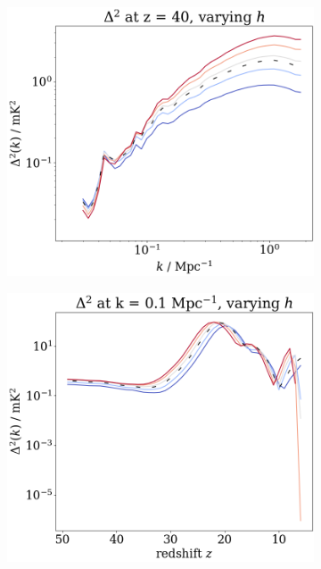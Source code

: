 \documentclass[floats,floatfix,showpacs,amssymb,prd,superscriptaddress,nofootinbib]{revtex4-2} %
\begin{document}
\begin{figure}[H]
\begin{subfigure}[b]{0.45\textwidth}
         \includegraphics[width=\textwidth]{images/simulation_results/power_spectrum_fixed_z_40_h.png}
         \label{fig:power_spectrum_fixed_z_40_h}
     \end{subfigure}
     \hfill
     \begin{subfigure}[b]{0.45\textwidth}
         \centering
         \includegraphics[width=\textwidth]{images/simulation_results/power_spectrum_fixed_k_0.1_h.png}
         \label{fig:power_spectrum_fixed_k_0.1_h}

\end{subfigure}
\end{figure}
\end{document}
